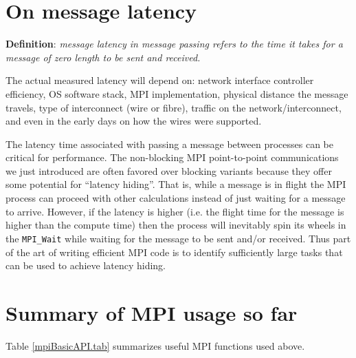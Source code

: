 \section{On message latency}

{\bf Definition}: \emph{message latency in message passing refers to the time it takes for a message of zero length to be sent and received.}

The actual measured latency will depend on: network interface controller efficiency, OS software stack, MPI implementation, physical distance the message travels, type of interconnect (wire or fibre), traffic on the network/interconnect, and even in the early days on how the wires were supported.

The latency time associated with passing a message between processes can be critical for performance. The non-blocking MPI point-to-point communications we just introduced are often favored over blocking variants because they offer some potential for ``latency hiding''. That is, while a message is in flight the MPI process can proceed with other calculations instead of just waiting for a message to arrive. However, if the latency is higher (i.e. the flight time for the message is higher than the compute time) then the process will inevitably spin its wheels in the \texttt{MPI\_Wait} while waiting for the message to be sent and/or received. Thus part of the art of writing efficient MPI code is to identify sufficiently large tasks that can be used to achieve latency hiding.

\section{Summary of MPI usage so far}

Table \ref{mpiBasicAPI.tab} summarizes useful MPI functions used above.


